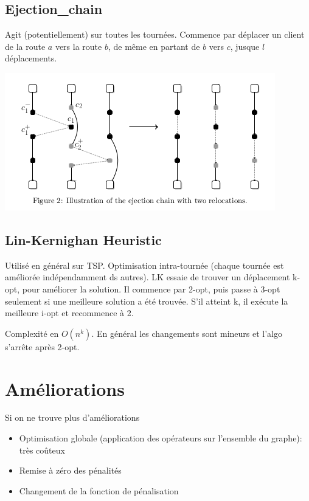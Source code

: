 \documentclass{beamer}
\begin{document}
\subsection{Ejection\_chain}
\begin{frame}
Agit (potentiellement) sur toutes les tournées. Commence par déplacer un client de la route $a$ vers la route $b$, de même en partant de $b$ vers $c$, jusque $l$ déplacements. 

	\centering
	\includegraphics[height=0.4\textheight]{ejection_chain.png}
\end{frame}


\subsection{Lin-Kernighan Heuristic}
\begin{frame}
Utilisé en général sur TSP. Optimisation intra-tournée (chaque tournée est améliorée indépendamment ds autres). LK essaie de trouver un déplacement k-opt, pour améliorer la solution. Il commence par 2-opt, puis passe à 3-opt seulement si une meilleure solution a été trouvée. S'il atteint k, il exécute la meilleure i-opt et recommence à 2.

Complexité en $O(n^k)$. En général les changements sont mineurs et l'algo s'arrête après 2-opt.

\end{frame} 

\section{Améliorations}
\begin{frame}
Si on ne trouve plus d'améliorations
\begin{itemize}
\item Optimisation globale (application des opérateurs sur l'ensemble du graphe): très coûteux
\item Remise à zéro des pénalités
\item Changement de la fonction de pénalisation

\end{itemize}

\end{frame}
\end{document}
